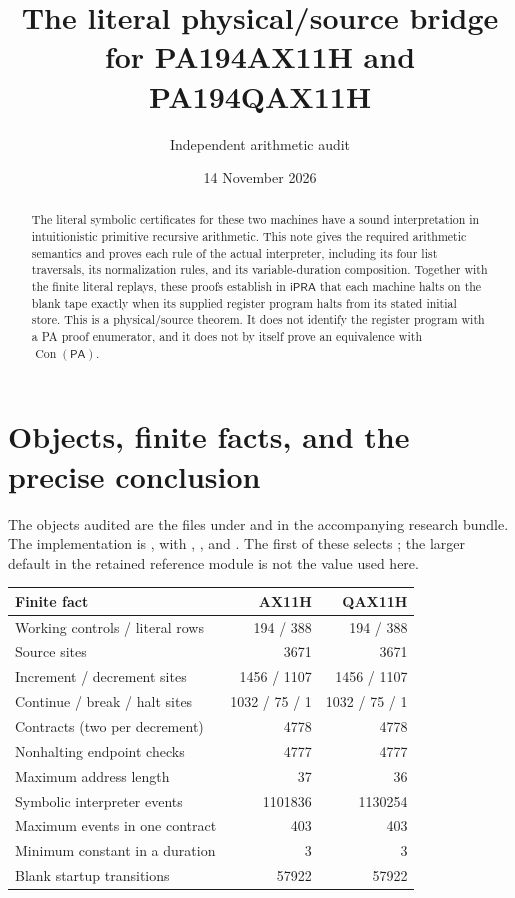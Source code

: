 \documentclass[11pt]{article}
\title{The literal physical/source bridge for PA194AX11H and PA194QAX11H}
\author{Independent arithmetic audit}
\date{14 November 2026}
\newcommand{\ipra}{\mathsf{iPRA}}
\begin{document}
\maketitle
\begin{abstract}
The literal symbolic certificates for these two machines have a sound
interpretation in intuitionistic primitive recursive arithmetic.  This note
gives the required arithmetic semantics and proves each rule of the actual
interpreter, including its four list traversals, its normalization rules,
and its variable-duration composition.  Together with the finite literal
replays, these proofs establish in $\ipra$ that each machine halts on the
blank tape exactly when its supplied register program halts from its stated
initial store.  This is a physical/source theorem.  It does not identify the
register program with a PA proof enumerator, and it does not by itself prove
an equivalence with $\operatorname{Con}(\mathsf{PA})$.
\end{abstract}

\section{Objects, finite facts, and the precise conclusion}

The objects audited are the files under
 and  in the
accompanying research bundle.  The implementation is
, with
,
, and .
The first of these selects ; the larger default in
the retained reference module is not the value used here.

\begin{center}
\begin{tabular}{lrr}
\toprule
Finite fact & AX11H & QAX11H\\
\midrule
Working controls / literal rows & 194 / 388 & 194 / 388\\
Source sites & 3671 & 3671\\
Increment / decrement sites & 1456 / 1107 & 1456 / 1107\\
Continue / break / halt sites & 1032 / 75 / 1 & 1032 / 75 / 1\\
Contracts (two per decrement) & 4778 & 4778\\
Nonhalting endpoint checks & 4777 & 4777\\
Maximum address length & 37 & 36\\
Symbolic interpreter events & 1101836 & 1130254\\
Maximum events in one contract & 403 & 403\\
Minimum constant in a duration & 3 & 3\\
Blank startup transitions & 57922 & 57922\\
\bottomrule
\end{tabular}
\end{center}
\end{document}
